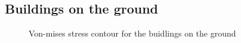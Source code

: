 \subsection{Buildings on the ground}

\begin{figure}
    \centering
    \caption{Von-mises stress contour for the buidlings on the ground}
\end{figure}
